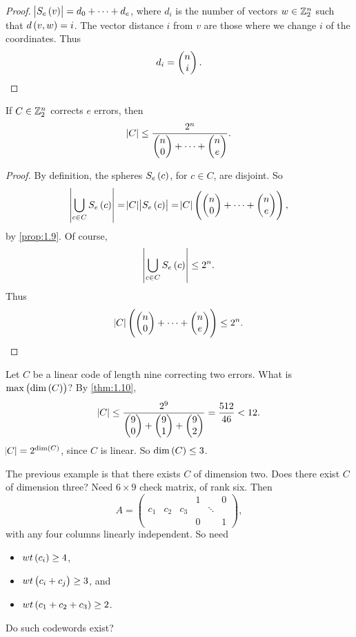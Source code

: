 \begin{proof}
$ \abs{S_e\br{v}} = d_0 + \dots + d_e $, where $ d_i $ is the number of vectors $ w \in \mathbb{Z}_2^n $ such that $ d\br{v, w} = i $. The vector distance $ i $ from $ v $ are those where we change $ i $ of the coordinates. Thus
$$ d_i = \begin{pmatrix} n \\ i \end{pmatrix}. $$
\end{proof}

\begin{theorem}
\label{thm:1.10}
If $ C \in \mathbb{Z}_2^n $ corrects $ e $ errors, then
$$ \abs{C} \le \dfrac{2^n}{\begin{pmatrix} n \\ 0 \end{pmatrix} + \dots + \begin{pmatrix} n \\ e \end{pmatrix}}. $$
\end{theorem}


\begin{proof}
By definition, the spheres $ S_e\br{c} $, for $ c \in C $, are disjoint. So
$$ \abs{\bigcup_{c \in C} S_e\br{c}} = \abs{C}\abs{S_e\br{c}} = \abs{C}\br{\twobyone{n}{0} + \dots + \twobyone{n}{e}}, $$
by \ref{prop:1.9}. Of course,
$$ \abs{\bigcup_{c \in C} S_e\br{c}} \le 2^n. $$
Thus
$$ \abs{C}\br{\twobyone{n}{0} + \dots + \twobyone{n}{e}} \le 2^n. $$
\end{proof}

\begin{example*}
Let $ C $ be a linear code of length nine correcting two errors. What is $ \max\br{\dim\br{C}} $? By \ref{thm:1.10},
$$ \abs{C} \le \dfrac{2^9}{\begin{pmatrix} 9 \\ 0 \end{pmatrix} + \begin{pmatrix} 9 \\ 1 \end{pmatrix} + \begin{pmatrix} 9 \\ 2 \end{pmatrix}} = \dfrac{512}{46} < 12. $$
$ \abs{C} = 2^{\dim\br{C}} $, since $ C $ is linear. So $ \dim\br{C} \le 3 $.
\end{example*}

The previous example is that there exists $ C $ of dimension two. Does there exist $ C $ of dimension three? Need $ 6 \times 9 $ check matrix, of rank six. Then
$$ A =
\begin{pmatrix}
& & & 1 & & 0 \\
c_1 & c_2 & c_3 & & \ddots & \\
& & & 0 & & 1
\end{pmatrix},
$$
with any four columns linearly independent. So need
\begin{itemize}
\item $ wt\br{c_i} \ge 4 $,
\item $ wt\br{c_i + c_j} \ge 3 $, and
\item $ wt\br{c_1 + c_2 + c_3} \ge 2 $.
\end{itemize}
Do such codewords exist?

